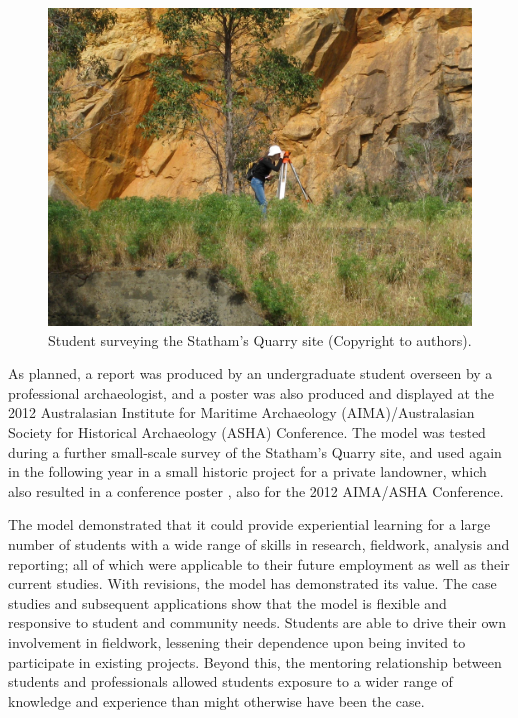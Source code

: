 \documentclass{ijsra}
\begin{document}
   	\begin{figure} %
   		\includegraphics[width=\linewidth]{figures/Fyfe-Figure03}
   		\caption{Student surveying the Statham's Quarry site (Copyright to authors).}
   		\centering
   		\label{fig:Fyfe-Figure03}
   	\end{figure}

As planned, a report \parencite{murszewskiwinter2012} was produced by an undergraduate student overseen by a professional archaeologist, 
and a poster \parencite{murszewski2012} was also produced and displayed at the 2012 Australasian Institute for Maritime Archaeology (AIMA)/Australasian Society for Historical Archaeology (ASHA) Conference. 
The model was tested during a further small-scale survey of the Statham’s Quarry site, and used again in the following year in a small historic project for a private landowner, which also resulted in a conference poster \parencite{busher2012}, also for the 2012 AIMA/ASHA Conference.

The model demonstrated that it could provide experiential learning for a large number of students with a wide range of skills in research, fieldwork, analysis and reporting; all of which were applicable to their future employment as well as their current studies. 
With revisions, the model has demonstrated its value. The case studies and subsequent applications show that the model is flexible and responsive to student and community needs. 
Students are able to drive their own involvement in fieldwork, lessening their dependence upon being invited to participate in existing projects. Beyond this, the mentoring relationship between students and professionals allowed students exposure to a wider range of knowledge and experience than might otherwise have been the case.
\end{document}
